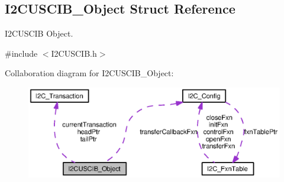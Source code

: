 \subsection{I2\-C\-U\-S\-C\-I\-B\-\_\-\-Object Struct Reference}
\label{struct_i2_c_u_s_c_i_b___object}


I2\-C\-U\-S\-C\-I\-B Object.  




{\ttfamily \#include $<$I2\-C\-U\-S\-C\-I\-B.\-h$>$}



Collaboration diagram for I2\-C\-U\-S\-C\-I\-B\-\_\-\-Object\-:
\nopagebreak
\begin{figure}[H]
\begin{center}
\leavevmode
\includegraphics[width=350pt]{struct_i2_c_u_s_c_i_b___object__coll__graph}
\end{center}
\end{figure}
